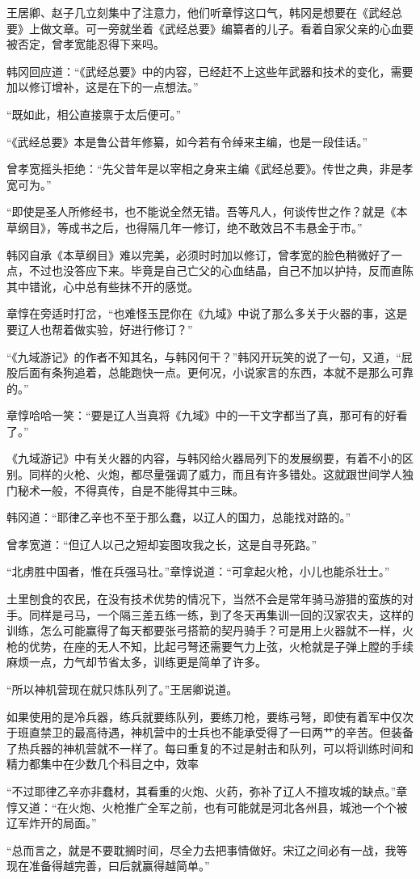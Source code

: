 王居卿、赵子几立刻集中了注意力，他们听章惇这口气，韩冈是想要在《武经总要》上做文章。可一旁就坐着《武经总要》编纂者的儿子。看着自家父亲的心血要被否定，曾孝宽能忍得下来吗。

韩冈回应道：“《武经总要》中的内容，已经赶不上这些年武器和技术的变化，需要加以修订增补，这是在下的一点想法。”

“既如此，相公直接禀于太后便可。”

“《武经总要》本是鲁公昔年修纂，如今若有令绰来主编，也是一段佳话。”

曾孝宽摇头拒绝：“先父昔年是以宰相之身来主编《武经总要》。传世之典，非是孝宽可为。”

“即使是圣人所修经书，也不能说全然无错。吾等凡人，何谈传世之作？就是《本草纲目》，等成书之后，也得隔几年一修订，绝不敢效吕不韦悬金于市。”

韩冈自承《本草纲目》难以完美，必须时时加以修订，曾孝宽的脸色稍微好了一点，不过也没答应下来。毕竟是自己亡父的心血结晶，自己不加以护持，反而直陈其中错讹，心中总有些抹不开的感觉。

章惇在旁适时打岔，“也难怪玉昆你在《九域》中说了那么多关于火器的事，这是要辽人也帮着做实验，好进行修订？”

“《九域游记》的作者不知其名，与韩冈何干？”韩冈开玩笑的说了一句，又道，“屁股后面有条狗追着，总能跑快一点。更何况，小说家言的东西，本就不是那么可靠的。”

章惇哈哈一笑：“要是辽人当真将《九域》中的一干文字都当了真，那可有的好看了。”

《九域游记》中有关火器的内容，与韩冈给火器局列下的发展纲要，有着不小的区别。同样的火枪、火炮，都尽量强调了威力，而且有许多错处。这就跟世间学人独门秘术一般，不得真传，自是不能得其中三昧。

韩冈道：“耶律乙辛也不至于那么蠢，以辽人的国力，总能找对路的。”

曾孝宽道：“但辽人以己之短却妄图攻我之长，这是自寻死路。”

“北虏胜中国者，惟在兵强马壮。”章惇说道：“可拿起火枪，小儿也能杀壮士。”

土里刨食的农民，在没有技术优势的情况下，当然不会是常年骑马游猎的蛮族的对手。同样是弓马，一个隔三差五练一练，到了冬天再集训一回的汉家农夫，这样的训练，怎么可能赢得了每天都要张弓搭箭的契丹骑手？可是用上火器就不一样，火枪的优势，在座的无人不知，比起弓弩还需要气力上弦，火枪就是子弹上膛的手续麻烦一点，力气却节省太多，训练更是简单了许多。

“所以神机营现在就只炼队列了。”王居卿说道。

如果使用的是冷兵器，练兵就要练队列，要练刀枪，要练弓弩，即使有着军中仅次于班直禁卫的最高待遇，神机营中的士兵也不能承受得了一曰两艹的辛苦。但装备了热兵器的神机营就不一样了。每曰重复的不过是射击和队列，可以将训练时间和精力都集中在少数几个科目之中，效率

“不过耶律乙辛亦非蠢材，其看重的火炮、火药，弥补了辽人不擅攻城的缺点。”章惇又道：“在火炮、火枪推广全军之前，也有可能就是河北各州县，城池一个个被辽军炸开的局面。”

“总而言之，就是不要耽搁时间，尽全力去把事情做好。宋辽之间必有一战，我等现在准备得越完善，曰后就赢得越简单。”